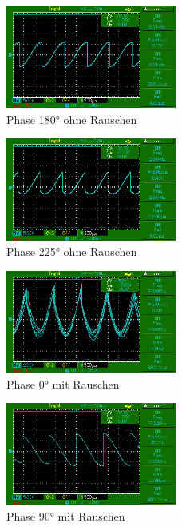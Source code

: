 \begin{figure}
    \centering
    \includegraphics[width=0.5\textwidth]{bilder/MAP003.png}
    \caption{Phase 180° ohne Rauschen}        
    \label{fig:MAP003}
\end{figure}

\begin{figure}
    \centering
    \includegraphics[width=0.5\textwidth]{bilder/MAP004.png}
    \caption{Phase 225° ohne Rauschen}        
    \label{fig:MAP004}
\end{figure}

\begin{figure}
    \centering
    \includegraphics[width=0.5\textwidth]{bilder/MAP007.png}
    \caption{Phase 0° mit Rauschen}        
    \label{fig:MAP007}
\end{figure}


\begin{figure}
    \centering
    \includegraphics[width=0.5\textwidth]{bilder/MAP009.png}
    \caption{Phase 90° mit Rauschen}        
    \label{fig:MAP009}
\end{figure}

